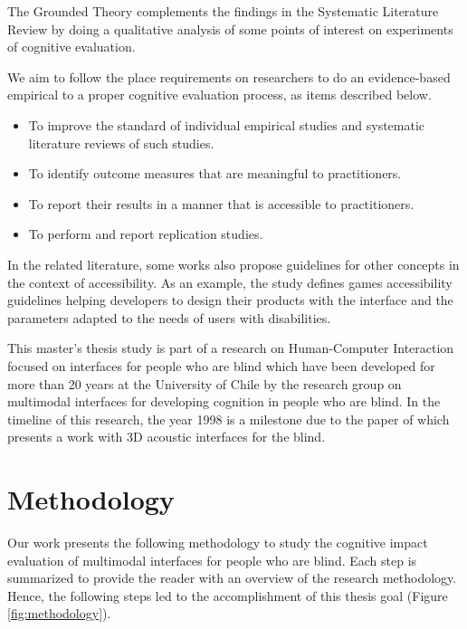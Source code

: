 The Grounded Theory complements the findings in the Systematic Literature Review by doing a qualitative analysis of some points of interest on experiments of cognitive evaluation.


We aim to follow the place requirements on researchers to do an evidence-based empirical  to a proper cognitive evaluation process, as items described below.

\begin{itemize}
    \item To improve the standard of individual empirical studies and systematic literature reviews of such studies.
    \item To identify outcome measures that are meaningful to practitioners.
    \item To report their results in a manner that is accessible to practitioners.
    \item To perform and report replication studies.
\end{itemize}

In the related literature, some works also propose guidelines for other concepts in the context of accessibility. As an example, the study \cite{Ossmann2006} defines games accessibility guidelines helping developers to design their products with the interface and the parameters adapted to the needs of users with disabilities.

This master's thesis study is part of a research on Human-Computer Interaction focused on interfaces for people who are blind which have been developed for more than 20 years at the University of Chile by the research group on multimodal interfaces for developing cognition in people who are blind. In the timeline of this research, the year 1998 is a milestone due to the paper of  which presents a work with 3D acoustic interfaces for the blind.

\section{Methodology}
\label{sec:introduction-methodology}
Our work presents the following methodology to study the cognitive impact evaluation of multimodal interfaces for people who are blind. Each step is summarized to provide the reader with an overview of the research methodology. Hence, the following steps led to the accomplishment of this thesis goal (Figure \ref{fig:methodology}).

